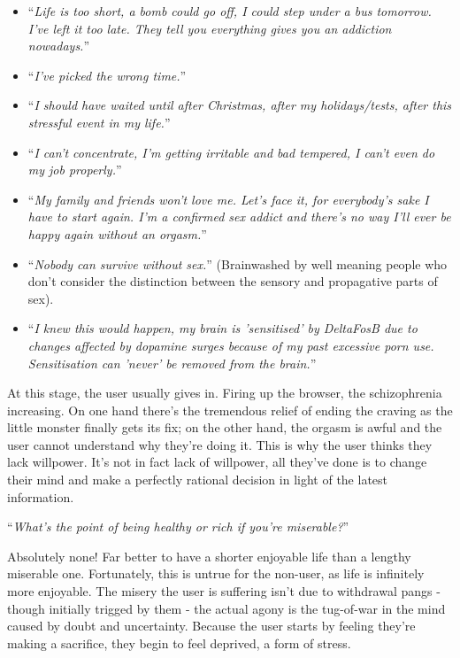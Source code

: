 \documentclass[
]{book}
\begin{document}
\begin{itemize}
\item
  ``\emph{Life is too short, a bomb could go off, I could step under a bus tomorrow. I've left it too late. They tell you everything gives you an addiction nowadays.}''
\item
  ``\emph{I've picked the wrong time.}''
\item
  ``\emph{I should have waited until after Christmas, after my holidays/tests, after this stressful event in my life.}''
\item
  ``\emph{I can't concentrate, I'm getting irritable and bad tempered, I can't even do my job properly.}''
\item
  ``\emph{My family and friends won't love me. Let's face it, for everybody's sake I have to start again. I'm a confirmed sex addict and there's no way I'll ever be happy again without an orgasm.}''
\item
  ``\emph{Nobody can survive without sex.}'' (Brainwashed by well meaning people who don't consider the distinction between the sensory and propagative parts of sex).
\item
  ``\emph{I knew this would happen, my brain is 'sensitised' by DeltaFosB due to changes affected by dopamine surges because of my past excessive porn use. Sensitisation can 'never' be removed from the brain.}''
\end{itemize}

At this stage, the user usually gives in. Firing up the browser, the schizophrenia increasing. On one hand there's the tremendous relief of ending the craving as the little monster finally gets its fix; on the other hand, the orgasm is awful and the user cannot understand why they're doing it. This is why the user thinks they lack willpower. It's not in fact lack of willpower, all they've done is to change their mind and make a perfectly rational decision in light of the latest information.

``\emph{What's the point of being healthy or rich if you're miserable?}''

Absolutely none! Far better to have a shorter enjoyable life than a lengthy miserable one. Fortunately, this is untrue for the non-user, as life is infinitely more enjoyable. The misery the user is suffering isn't due to withdrawal pangs - though initially trigged by them - the actual agony is the tug-of-war in the mind caused by doubt and uncertainty. Because the user starts by feeling they're making a sacrifice, they begin to feel deprived, a form of stress.
\end{document}
